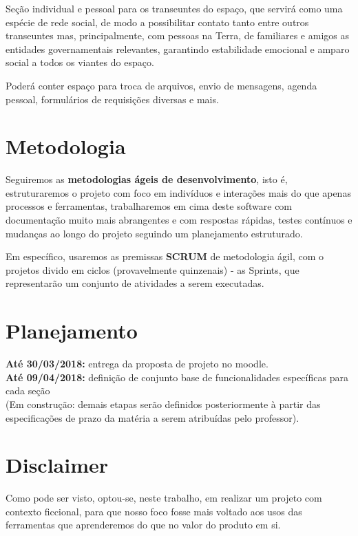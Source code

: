 \documentclass[12pt]{exam}
\begin{document}
    Seção individual e pessoal para os transeuntes do espaço, que servirá como uma espécie de rede social, de modo a possibilitar contato tanto entre outros transeuntes mas, principalmente, com pessoas na Terra, de familiares e amigos as entidades governamentais relevantes, garantindo estabilidade emocional e amparo social a todos os viantes do espaço. 
    
    Poderá conter espaço para troca de arquivos, envio de mensagens, agenda pessoal, formulários de requisições diversas e mais.  \\
    
    
\section{Metodologia}

	Seguiremos as \textbf{metodologias ágeis de desenvolvimento}, isto é, estruturaremos o projeto com foco em indivíduos e interações mais do que apenas processos e ferramentas, trabalharemos em cima deste software com documentação muito mais abrangentes e com respostas rápidas, testes contínuos e mudanças ao longo do projeto seguindo um planejamento estruturado.
	
    Em específico, usaremos as premissas \textbf{SCRUM} de metodologia ágil, com o projetos divido em ciclos (provavelmente quinzenais) - as Sprints, que representarão um conjunto de atividades a serem executadas. 
    
\section{Planejamento}
	\textbf{Até 30/03/2018:} entrega da proposta de projeto no moodle. \\    
    \textbf{Até 09/04/2018:} definição de conjunto base de funcionalidades específicas para cada seção \\
    
   	(Em construção: demais etapas serão definidos posteriormente à partir das especificações de prazo da matéria a serem atribuídas pelo professor). \\
    
\section{Disclaimer}
	
	Como pode ser visto, optou-se, neste trabalho, em realizar um projeto com contexto ficcional, para que nosso foco fosse mais voltado aos usos das ferramentas que  aprenderemos do que no valor do produto em si. 
    

	 
	
	
	
\end{document}
